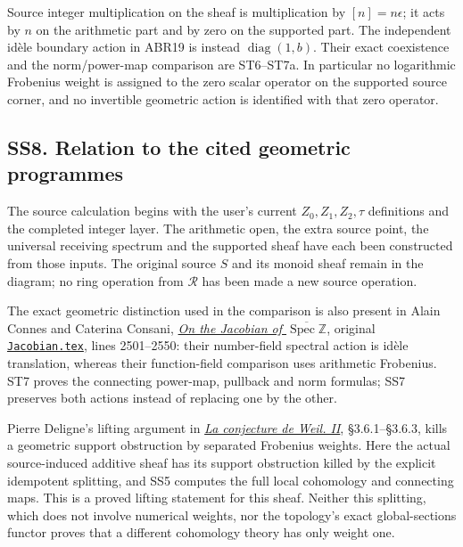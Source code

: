 Source integer multiplication on the sheaf is multiplication by
\([n]=n\epsilon\); it acts by \(n\) on the arithmetic part and by zero
on the supported part. The independent idèle boundary action in ABR19 is
instead \(\operatorname{diag}(1,b)\). Their exact coexistence and the
norm/power-map comparison are ST6--ST7a. In particular no logarithmic
Frobenius weight is assigned to the zero scalar operator on the
supported source corner, and no invertible geometric action is
identified with that zero operator.

\subsection{SS8. Relation to the cited geometric
programmes}\label{ss8.-relation-to-the-cited-geometric-programmes}

The source calculation begins with the user's current
\(Z_0,Z_1,Z_2,\tau\) definitions and the completed integer layer. The
arithmetic open, the extra source point, the universal receiving
spectrum and the supported sheaf have each been constructed from those
inputs. The original source \(S\) and its monoid sheaf remain in the
diagram; no ring operation from \(\mathcal R\) has been made a new
source operation.

The exact geometric distinction used in the comparison is also present
in Alain Connes and Caterina Consani,
\href{https://arxiv.org/abs/2602.15941v1}{\emph{On the Jacobian of
\(\overline{\operatorname{Spec}\mathbb Z}\)}}, original
\href{https://arxiv.org/abs/2602.15941v1}{\nolinkurl{Jacobian.tex}}, lines 2501--2550: their
number-field spectral action is idèle translation, whereas their
function-field comparison uses arithmetic Frobenius. ST7 proves the
connecting power-map, pullback and norm formulas; SS7 preserves both
actions instead of replacing one by the other.

Pierre Deligne's lifting argument in
\href{https://www.numdam.org/item/PMIHES_1980__52__137_0/}{\emph{La
conjecture de Weil. II}}, §3.6.1--§3.6.3, kills a geometric support
obstruction by separated Frobenius weights. Here the actual
source-induced additive sheaf has its support obstruction killed by the
explicit idempotent splitting, and SS5 computes the full local
cohomology and connecting maps. This is a proved lifting statement for
this sheaf. Neither this splitting, which does not involve numerical
weights, nor the topology's exact global-sections functor proves that a
different cohomology theory has only weight one.

